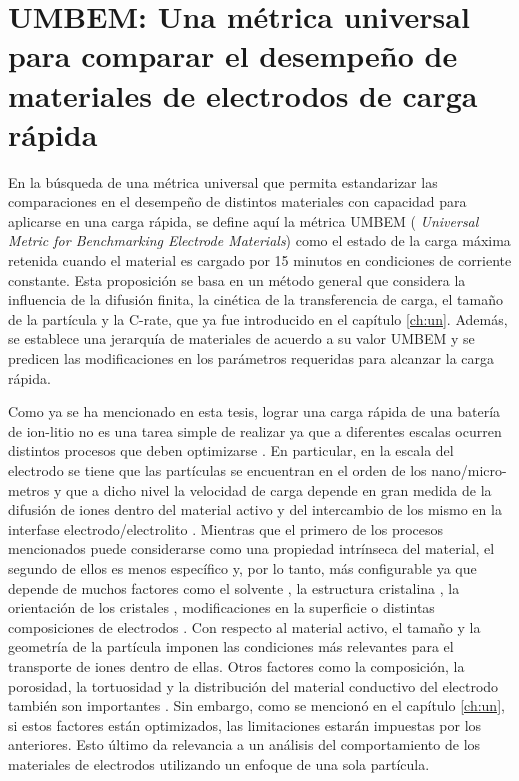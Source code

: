 \chapter{UMBEM: Una métrica universal para comparar el desempeño de materiales de electrodos de carga rápida}\label{ch:umbem}
\thispagestyle{empty}

\vspace{50pt}

\begin{adjustwidth}{50pt}{50pt}
    En la búsqueda de una métrica universal que permita estandarizar las 
    comparaciones en el desempeño de distintos materiales con capacidad para
    aplicarse en una carga rápida, se define aquí la métrica UMBEM (
    \textit{Universal Metric for Benchmarking Electrode Materials}) como el 
    estado de la carga máxima retenida cuando el material es cargado por 15 
    minutos en condiciones de corriente constante. Esta proposición se basa 
    en un método general que considera la influencia de la difusión finita, 
    la cinética de la transferencia de carga, el tamaño de la partícula y la 
    C-rate, que ya fue introducido en el capítulo \ref{ch:un}. Además, se establece
    una jerarquía de materiales de acuerdo a su valor UMBEM y se predicen las 
    modificaciones en los parámetros requeridas para alcanzar la carga rápida.
\end{adjustwidth}

\clearpage
\newpage
\thispagestyle{empty}
\mbox{}
\newpage

Como ya se ha mencionado en esta tesis, lograr una carga rápida de una batería 
de ion-litio no es una tarea simple de realizar ya que a diferentes escalas 
ocurren distintos procesos que deben optimizarse \cite{franco2013}. En 
particular, en la escala del electrodo se tiene que las partículas se encuentran
en el orden de los nano/micro-metros y que a dicho nivel la velocidad de carga 
depende en gran medida de la difusión de iones dentro del material activo y del
intercambio de los mismo en la interfase electrodo/electrolito \cite{weiss2021}.
Mientras que el primero de los procesos mencionados puede considerarse como una 
propiedad intrínseca del material, el segundo de ellos es menos específico y, 
por lo tanto, más configurable ya que depende de muchos factores como el 
solvente \cite{levin2017}, la estructura cristalina \cite{li2022}, la
orientación de los cristales \cite{mala2020}, modificaciones en la superficie o 
distintas composiciones de electrodos \cite{kaur2022}. Con respecto al material
activo, el tamaño y la geometría de la partícula imponen las condiciones más
relevantes para el transporte de iones dentro de ellas. Otros factores como la 
composición, la porosidad, la tortuosidad y la distribución del material 
conductivo del electrodo también son importantes \cite{weiss2021}. Sin embargo,
como se mencionó en el capítulo \ref{ch:un}, si estos factores están 
optimizados, las limitaciones estarán impuestas por los anteriores. Esto último
da relevancia a un análisis del comportamiento de los materiales de electrodos
utilizando un enfoque de una sola partícula.

